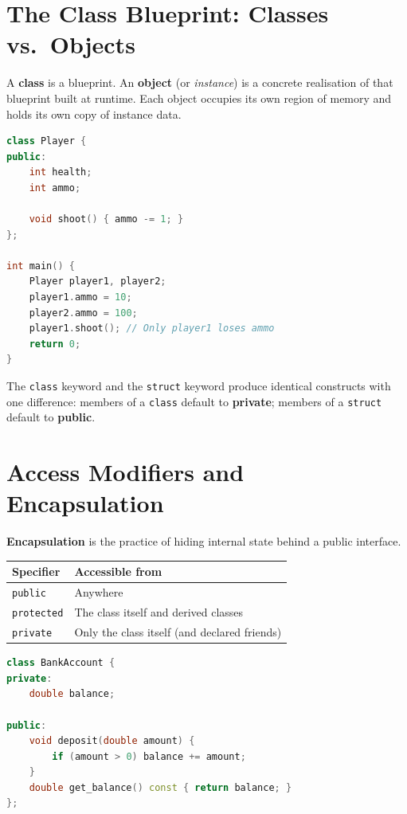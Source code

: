 \section{The Class Blueprint: Classes vs.\ Objects}
\label{sec:class-blueprint}

A \textbf{class} is a blueprint. An \textbf{object} (or \textit{instance}) is a concrete realisation of that blueprint built at runtime. Each object occupies its own region of memory and holds its own copy of instance data.

\begin{lstlisting}[language=C++, caption={Class definition and object instantiation}]
class Player {
public:
    int health;
    int ammo;

    void shoot() { ammo -= 1; }
};

int main() {
    Player player1, player2;
    player1.ammo = 10;
    player2.ammo = 100;
    player1.shoot(); // Only player1 loses ammo
    return 0;
}
\end{lstlisting}

The \texttt{class} keyword and the \texttt{struct} keyword produce identical constructs with one difference: members of a \texttt{class} default to \textbf{private}; members of a \texttt{struct} default to \textbf{public}.

\section{Access Modifiers and Encapsulation}
\label{sec:access-encapsulation}

\textbf{Encapsulation} is the practice of hiding internal state behind a public interface.

\begin{center}
\begin{tabular}{|l|l|}
\hline
\textbf{Specifier} & \textbf{Accessible from} \\
\hline
\texttt{public}    & Anywhere \\
\texttt{protected} & The class itself and derived classes \\
\texttt{private}   & Only the class itself (and declared friends) \\
\hline
\end{tabular}
\end{center}

\begin{lstlisting}[language=C++, caption={Encapsulated BankAccount}]
class BankAccount {
private:
    double balance;

public:
    void deposit(double amount) {
        if (amount > 0) balance += amount;
    }
    double get_balance() const { return balance; }
};
\end{lstlisting}

